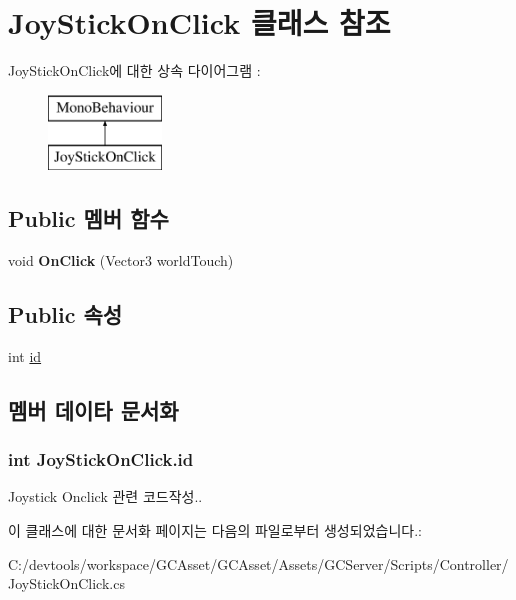 \hypertarget{class_joy_stick_on_click}{}\section{Joy\+Stick\+On\+Click 클래스 참조}
\label{class_joy_stick_on_click}
Joy\+Stick\+On\+Click에 대한 상속 다이어그램 \+: \begin{figure}[H]
\begin{center}
\leavevmode
\includegraphics[height=2.000000cm]{class_joy_stick_on_click}
\end{center}
\end{figure}
\subsection*{Public 멤버 함수}
\begin{DoxyCompactItemize}
\item 
\hypertarget{class_joy_stick_on_click_a073292fbe66e76a89f3dcd429ab3abd7}{}void {\bfseries On\+Click} (Vector3 world\+Touch)\label{class_joy_stick_on_click_a073292fbe66e76a89f3dcd429ab3abd7}

\end{DoxyCompactItemize}
\subsection*{Public 속성}
\begin{DoxyCompactItemize}
\item 
int \hyperlink{class_joy_stick_on_click_a78bb7b09941beda24f6e9c50a946584d}{id}
\end{DoxyCompactItemize}


\subsection{멤버 데이타 문서화}
\hypertarget{class_joy_stick_on_click_a78bb7b09941beda24f6e9c50a946584d}{}
\subsubsection[{id}]{\setlength{\rightskip}{0pt plus 5cm}int Joy\+Stick\+On\+Click.\+id}\label{class_joy_stick_on_click_a78bb7b09941beda24f6e9c50a946584d}
Joystick Onclick 관련 코드작성.. 

이 클래스에 대한 문서화 페이지는 다음의 파일로부터 생성되었습니다.\+:\begin{DoxyCompactItemize}
\item 
C\+:/devtools/workspace/\+G\+C\+Asset/\+G\+C\+Asset/\+Assets/\+G\+C\+Server/\+Scripts/\+Controller/Joy\+Stick\+On\+Click.\+cs\end{DoxyCompactItemize}
